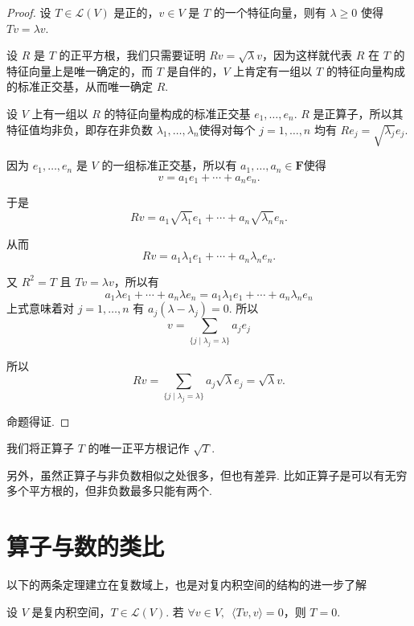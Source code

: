 \begin{proof}
    设 $ T \in \mathcal{L}(V) $ 是正的，$ v \in V $ 是 $ T $ 的一个特征向量，则有 $ \lambda \geqslant 0 $ 使得 $ Tv = \lambda v $.

    设 $ R $ 是 $ T $ 的正平方根，我们只需要证明 $ Rv = \sqrt{\lambda} v $，因为这样就代表 $ R $ 在 $ T $ 的特征向量上是唯一确定的，而 $ T $ 是自伴的，$ V $ 上肯定有一组以 $ T $ 的特征向量构成的标准正交基，从而唯一确定 $ R $.

    设 $ V $ 上有一组以 $ R $ 的特征向量构成的标准正交基 $ e_1, \ldots , e_n $. $ R $ 是正算子，所以其特征值均非负，即存在非负数 $\lambda_1, \ldots , \lambda_n $使得对每个 $ j = 1, \ldots , n $ 均有 $ Re_j = \sqrt{\lambda_j}e_j $.

    因为 $ e_1, \ldots , e_n $ 是 $ V $ 的一组标准正交基，所以有 $ a_1, \ldots , a_n \in \mathbf{F} $使得
    \[ v = a_1e_1 + \cdots + a_ne_n. \]

    于是
    \[ Rv = a_1\sqrt{\lambda_1}e_1 + \cdots + a_n\sqrt{\lambda_n}e_n. \]

    从而
    \[ Rv = a_1\lambda_1e_1 + \cdots + a_n\lambda_ne_n. \]

    又 $ R^{2} = T $ 且 $ Tv = \lambda v $，所以有
    \[ a_1\lambda e_1 + \cdots + a_n\lambda e_n = a_1\lambda_1e_1 + \cdots + a_n\lambda_ne_n \]
    上式意味着对 $ j = 1, \ldots, n $ 有 $ a_j(\lambda - \lambda_j) = 0 $. 所以
    \[ v = \sum_{\{j \mid \lambda_j = \lambda \}} a_je_j \]

    所以
    \[ Rv = \sum_{\{j \mid \lambda_j = \lambda \}} a_j\sqrt{\lambda}e_j = \sqrt{\lambda}v. \]

    命题得证.
\end{proof}

我们将正算子 $ T $ 的唯一正平方根记作 $ \sqrt{T} $.

另外，虽然正算子与非负数相似之处很多，但也有差异. 比如正算子是可以有无穷多个平方根的，但非负数最多只能有两个.

\section{算子与数的类比}

以下的两条定理建立在复数域上，也是对复内积空间的结构的进一步了解

\begin{theorem} \label{thm:24:复内积空间}
    设 $ V $ 是复内积空间，$ T \in \mathcal{L}(V) $. 若 $ \forall v \in V,\enspace \langle Tv, v \rangle = 0 $，则 $ T = 0 $.
\end{theorem}

